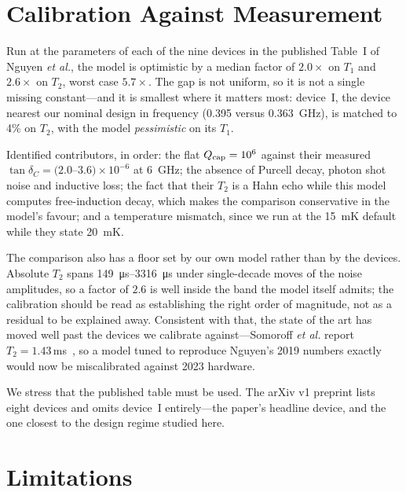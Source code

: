 \documentclass[journal]{IEEEtran}
\begin{document}
\section{Calibration Against Measurement}
\label{sec:calibration}

Run at the parameters of each of the nine devices in the published Table~I of Nguyen
\emph{et al.}, the model is optimistic by a median factor of $2.0\times$ on $T_1$ and
$2.6\times$ on $T_2$, worst case $5.7\times$. The gap is not uniform, so it is not a single
missing constant---and it is smallest where it matters most: device~I, the device nearest our
nominal design in frequency (0.395 versus \SI{0.363}{\giga\hertz}), is matched to 4\% on
$T_2$, with the model \emph{pessimistic} on its $T_1$.

Identified contributors, in order: the flat $Q_{\rm cap} = 10^6$ against their measured
$\tan\delta_C = (2.0$--$3.6)\times10^{-6}$ at \SI{6}{\giga\hertz}; the absence of Purcell
decay, photon shot noise and inductive loss; the fact that their $T_2$ is a Hahn echo while
this model computes free-induction decay, which makes the comparison conservative in the
model's favour; and a temperature mismatch, since we run at the \SI{15}{\milli\kelvin}
default while they state \SI{20}{\milli\kelvin}.

The comparison also has a floor set by our own model rather than by the devices. Absolute
$T_2$ spans \SIrange{149}{3316}{\micro\second} under single-decade moves of the noise
amplitudes, so a factor of $2.6$ is well inside the band the model itself admits; the
calibration should be read as establishing the right order of magnitude, not as a residual to
be explained away. Consistent with that, the state of the art has moved well past the devices
we calibrate against---Somoroff \emph{et al.} report $T_2 = 1.43$\,ms~\cite{somoroff2023}, so
a model tuned to reproduce Nguyen's 2019 numbers exactly would now be miscalibrated against
2023 hardware.

We stress that the published table must be used. The arXiv v1 preprint lists eight devices
and omits device~I entirely---the paper's headline device, and the one closest to the design
regime studied here.

\section{Limitations}
\end{document}
